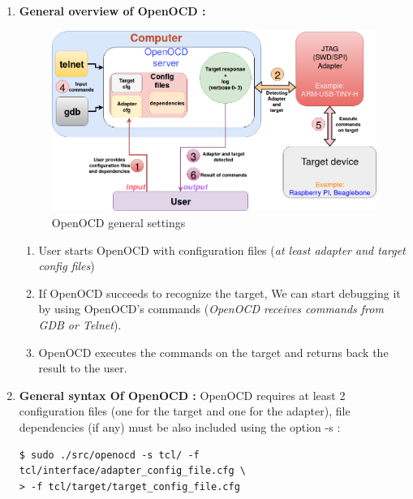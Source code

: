 \begin{enumerate}
	\item \textbf{General overview of OpenOCD : } 
		\begin{figure}[H]
			\centering
        	\includegraphics[scale=0.28]{img/solution/openOCDDiagram.png}
        	\caption{OpenOCD general settings}
        	\label{OpenOCD general settings}
    	\end{figure}
	
		\begin{enumerate}
			\item {User starts OpenOCD with configuration files (\textit{at least adapter and target config files})}
			
			\item {If OpenOCD succeeds to recognize the target, We can start debugging it by using OpenOCD's commands (\textit{OpenOCD receives commands from GDB or Telnet})}.
			
			\item {OpenOCD executes the commands on the target and returns back the result to the user}.
		\end{enumerate}		
	
	\item \textbf{General syntax Of OpenOCD : }	OpenOCD requires at least 2 configuration files (one for the target and one for the adapter), file dependencies (if any)  must be also included using the option -s :
	
	\begin{lstlisting}[style=BashInputStyle]	
$ sudo ./src/openocd -s tcl/ -f tcl/interface/adapter_config_file.cfg \ 
> -f tcl/target/target_config_file.cfg	
	\end{lstlisting}
		

\end{enumerate}
